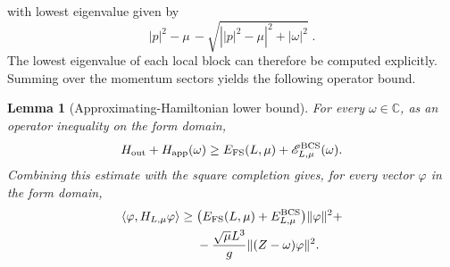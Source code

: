 \documentclass[11pt]{amsart}
\newtheorem{lemma}[definition]{Lemma}
\theoremstyle{definition}
\numberwithin{equation}{section}
\newcommand{\C}{\mathbb C}
\newcommand{\1}{\mathbf 1}
\begin{document}
with lowest eigenvalue given by 
\begin{equation*}
    |p|^2 - \mu\, - \sqrt{\left| |p|^2 - \mu \right|^2 + |\omega|^2}\;. 
\end{equation*}
The lowest eigenvalue of each local block can therefore be computed explicitly. Summing over the momentum sectors yields the following operator bound.
\begin{lemma}[Approximating-Hamiltonian lower bound]
\label{lem:approximating-bound}
For every \(\omega\in\C\), as an operator inequality on the form domain,
\begin{equation}\label{eq:app-operator-bound}
 H_{\rm out}+H_{\rm app}(\omega)
 \ge
 E_{\rm FS}(L,\mu) + \mathscr E^{\rm BCS}_{L,\mu}(\omega).
\end{equation}
Combining this estimate with the square completion gives, for every vector $\varphi$ in the form domain,
\begin{align}
 \langle\varphi,H_{L,\mu}\varphi\rangle
 \ge{}&
 \bigl(E_{\rm FS}(L,\mu) + E^{\rm BCS}_{L,\mu}\bigr)
 \|\varphi\|^2 +
 \nonumber\\
 &-\frac{\sqrt{\mu}L^3}{g}
 \|(Z-\omega)\varphi\|^2.
 \label{eq:app-form-bound}
\end{align}
\end{lemma}
\end{document}
